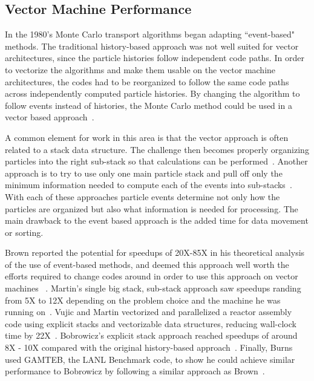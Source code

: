 \subsection*{Vector Machine Performance}

%
In the 1980's Monte Carlo transport algorithms began adapting ``event-based" methods.
%
The traditional history-based approach was not well suited for vector architectures, since the particle histories follow independent code paths.
%
In order to vectorize the algorithms and make them usable on the vector machine architectures, the codes had to be reorganized to follow the same code paths across independently computed particle histories.
%
By changing the algorithm to follow events instead of histories, the Monte Carlo method could be used in a vector based approach~\cite{martin1986monte}.
%

%
A common element for work in this area is that the vector approach is often related to a stack data structure.
%
The challenge then becomes properly organizing particles into the right sub-stack so that calculations can be performed~\cite{brown1984monte, bobrowicz1984vectorized}.
%
Another approach is to try to use only one main particle stack and pull off only the minimum information needed to compute each of the events into sub-stacks~\cite{martin1986monte}.
%
With each of these approaches particle events determine not only how the particles are organized but also what information is needed for processing. 
%
The main drawback to the event based approach is the added time for data movement or sorting.
%

%
Brown reported the potential for speedups of 20X-85X in his theoretical analysis of the use of event-based methods, and deemed this approach well worth the efforts required to change codes around in order to use this approach on vector machines ~\cite{brown1984monte}.
%
Martin's single big stack, sub-stack approach saw speedups randing from 5X to 12X depending on the problem choice and the machine he was running on~\cite{martin1986monte}.
%
Vujic and Martin vectorized and parallelized a reactor assembly code using explicit stacks and vectorizable data structures, reducing wall-clock time by 22X~\cite{vujic1991vectorization}.
%
Bobrowicz's explicit stack approach reached speedups of around 8X - 10X compared with the original history-based approach~\cite{bobrowicz1984vectorized}.
%
Finally, Burns used GAMTEB, the LANL Benchmark code, to show he could achieve similar performance to Bobrowicz by following a similar approach as Brown~\cite{burns1989vectorization}.
%

